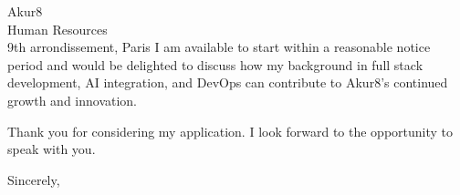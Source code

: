 \documentclass[11pt,a4paper]{letter}
\begin{document}
\begin{letter}{
    Akur8 \\
    Human Resources \\
    9th arrondissement, Paris
}
I am available to start within a reasonable notice period and would be delighted to discuss how my background in full stack development, AI integration, and DevOps can contribute to Akur8's continued growth and innovation.

Thank you for considering my application. I look forward to the opportunity to speak with you.

\closing{Sincerely,}

\end{letter}
\end{document}
